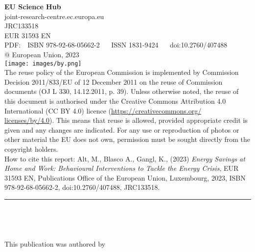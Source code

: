 {\begin{titlepage}
        \textbf{EU Science Hub}\\
        joint-research-centre.ec.europa.eu\\
        
        
        {JRC133518}\\
        {EUR 31593 EN}\\
        
        PDF: \,\, ISBN 978-92-68-05662-2 \,\,\,\,\,\,
        ISSN 1831-9424 \,\,\,\,\,\,
        doi:10.2760/407488\\

        {@ European Union, 2023}\\ 

        \texttt{[image: images/by.png]}\\

        The reuse policy of the European Commission is implemented by Commission Decision 2011/833/EU of 12 December 2011 on the reuse of Commission documents (OJ L 330, 14.12.2011, p. 39). Unless otherwise noted, the reuse of this document is authorised under the Creative Commons Attribution 4.0 International (CC BY 4.0) licence (\url{https://creativecommons.org/ licenses/by/4.0}). This means that reuse is allowed, provided appropriate credit is given and any changes are indicated. For any use or reproduction of photos or other material the EU does not own, permission must be sought directly from the copyright holders.\\

        How to cite this report: Alt, M., Blasco A., Gangl, K., (2023) \emph{Energy Savings at Home and Work: Behavioural Interventions to Tackle the Energy Crisis}, EUR 31593 EN, Publications Office of the European Union, Luxembourg, 2023, ISBN 978-92-68-05662-2, doi:10.2760/407488, JRC133518.

        \clearpage 
        \topskip=120pt
        \begin{center}
            \hfill\parbox{1\textwidth}{%
                \rule{\linewidth}{0.5mm} \\[0.4cm]
                \begin{spacing}{2.5}
                \textbf{\color{gray}\Huge\@title}
                \end{spacing}
            }\\
            \vspace{60pt}
            {\Large\@date}
        \end{center}
    
        \vfill
        This publication was authored by \@author

    \end{titlepage}
}
\makeatother